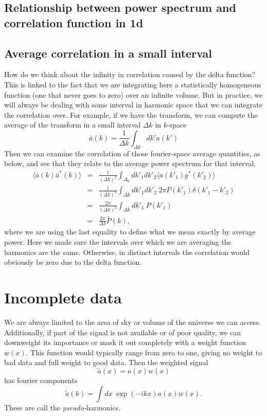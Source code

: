\subsection{Relationship between power spectrum and correlation function in 1d}




\subsection{Average correlation in a small interval}
How do we think about the infinity in correlation caused by the delta function?  This is linked to the fact that we are integrating here a statistically homogeneous function (one that never goes to zero) over an infinite volume.  But in practice, we will always be dealing with some interval in harmonic space that we can integrate the correlation over.  For example, if we have the transform, we can compute the average of the transform in a small interval $\Delta k$ in $k$-space
\begin{equation}
  \bar a(k) = \frac{1}{\Delta k} \int_{\Delta k} dk' a(k')
\end{equation}
Then we can examine the correlation of those fourier-space average quantities, as below, and see that they relate to the average power spectrum for that interval. 
\begin{eqnarray}
  \langle \bar a(k)  \bar a^*(k) \rangle &=& \frac{1}{(\Delta k)^2} \int_{\Delta_k} dk'_1 dk'_2 \langle a(k'_1) g^*(k'_2) \rangle \\
  &=& \frac{1}{(\Delta k)^2} \int_{\Delta k} dk'_1 dk'_2 \ 2\pi P(k'_1) \delta(k'_1 - k'_2) \\
  &=& \frac{2\pi}{(\Delta k)^2}  \int_{\Delta k} dk'_1 \  P(k'_1) \\
  &=& \frac{2\pi}{\Delta k}  \bar P(k),
\end{eqnarray}
where we are using the last equality to define what we mean exactly by average power.  Here we made sure the intervals over which we are averaging the harmonics are the same.  Otherwise, in distinct intervals the correlation would obviously be zero due to the delta function.


\section{Incomplete data}

We are always limited to the area of sky or volume of the universe we can access.  Additionally, if part of the signal is not available or of poor quality, we can downweight its importance or mask it out completely with a weight function $w(x)$.  This function would typically range from zero to one, giving no weight to bad data and full weight to good data.  Then the weighted signal
\begin{equation}\tilde a(x) = a(x) w(x)\end{equation}
has fourier components
\begin{equation}
  \tilde a(k) = \int dx\  \exp(-i k x) a(x) w(x).
\end{equation}
These are call the \textit{pseudo-}harmonics.

